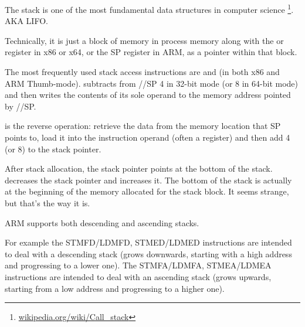 \mysection{\Stack}
\label{sec:stack}
\myindex{\Stack}

The stack is one of the most fundamental data structures in computer science
\footnote{\href{http://go.yurichev.com/17119}{wikipedia.org/wiki/Call\_stack}}.
\ac{AKA} \ac{LIFO}.

Technically, it is just a block of memory in process memory along with the \ESP or \RSP register in x86 or x64, or the \ac{SP} register in ARM, as a pointer within that block.

The most frequently used stack access instructions are \PUSH and \POP (in both x86 and ARM Thumb-mode). 
\PUSH subtracts from \ESP/\RSP/\ac{SP} 4 in 32-bit mode (or 8 in 64-bit mode) and then writes the contents of its sole operand to the memory address pointed by \ESP/\RSP/\ac{SP}.

\POP is the reverse operation: retrieve the data from the memory location that \ac{SP} points to, 
load it into the instruction operand (often a register) and then add 4 (or 8) to the \gls{stack pointer}.

After stack allocation, the \gls{stack pointer} points at the bottom of the stack.
\PUSH decreases the \gls{stack pointer} and \POP increases it.
The bottom of the stack is actually at the beginning of the memory allocated for the stack block. It seems strange, but that's the way it is.

ARM supports both descending and ascending stacks.


For example the \ac{STMFD}/\ac{LDMFD}, \ac{STMED}/\ac{LDMED} instructions are intended to deal with a descending stack (grows downwards, starting with a high address and progressing to a lower one).
The \ac{STMFA}/\ac{LDMFA}, \ac{STMEA}/\ac{LDMEA} instructions are intended to deal with an ascending stack (grows upwards, starting from a low address and progressing to a higher one).


